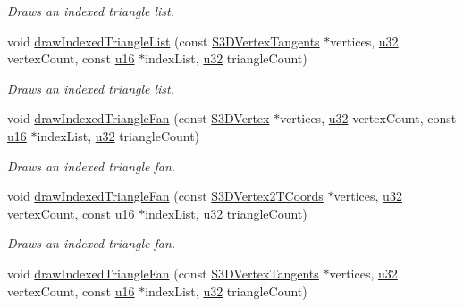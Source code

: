 \begin{DoxyCompactItemize}
\begin{DoxyCompactList}\small\item\em Draws an indexed triangle list. \end{DoxyCompactList}\item 
void \hyperlink{classirr_1_1video_1_1IVideoDriver_a09777bd8ca7a25e6f6134369e5dfb680}{draw\+Indexed\+Triangle\+List} (const \hyperlink{structirr_1_1video_1_1S3DVertexTangents}{S3\+D\+Vertex\+Tangents} $\ast$vertices, \hyperlink{namespaceirr_a0416a53257075833e7002efd0a18e804}{u32} vertex\+Count, const \hyperlink{namespaceirr_ae9f8ec82692ad3b83c21f555bfa70bcc}{u16} $\ast$index\+List, \hyperlink{namespaceirr_a0416a53257075833e7002efd0a18e804}{u32} triangle\+Count)
\begin{DoxyCompactList}\small\item\em Draws an indexed triangle list. \end{DoxyCompactList}\item 
void \hyperlink{classirr_1_1video_1_1IVideoDriver_a8303b9a0f3e941d07d8cdc70c8fc1346}{draw\+Indexed\+Triangle\+Fan} (const \hyperlink{structirr_1_1video_1_1S3DVertex}{S3\+D\+Vertex} $\ast$vertices, \hyperlink{namespaceirr_a0416a53257075833e7002efd0a18e804}{u32} vertex\+Count, const \hyperlink{namespaceirr_ae9f8ec82692ad3b83c21f555bfa70bcc}{u16} $\ast$index\+List, \hyperlink{namespaceirr_a0416a53257075833e7002efd0a18e804}{u32} triangle\+Count)
\begin{DoxyCompactList}\small\item\em Draws an indexed triangle fan. \end{DoxyCompactList}\item 
void \hyperlink{classirr_1_1video_1_1IVideoDriver_ae0b8902326a78075ad1b12d0cfc722aa}{draw\+Indexed\+Triangle\+Fan} (const \hyperlink{structirr_1_1video_1_1S3DVertex2TCoords}{S3\+D\+Vertex2\+T\+Coords} $\ast$vertices, \hyperlink{namespaceirr_a0416a53257075833e7002efd0a18e804}{u32} vertex\+Count, const \hyperlink{namespaceirr_ae9f8ec82692ad3b83c21f555bfa70bcc}{u16} $\ast$index\+List, \hyperlink{namespaceirr_a0416a53257075833e7002efd0a18e804}{u32} triangle\+Count)
\begin{DoxyCompactList}\small\item\em Draws an indexed triangle fan. \end{DoxyCompactList}\item 
void \hyperlink{classirr_1_1video_1_1IVideoDriver_a7fbc69e35e987b4d3882e51a62b8030b}{draw\+Indexed\+Triangle\+Fan} (const \hyperlink{structirr_1_1video_1_1S3DVertexTangents}{S3\+D\+Vertex\+Tangents} $\ast$vertices, \hyperlink{namespaceirr_a0416a53257075833e7002efd0a18e804}{u32} vertex\+Count, const \hyperlink{namespaceirr_ae9f8ec82692ad3b83c21f555bfa70bcc}{u16} $\ast$index\+List, \hyperlink{namespaceirr_a0416a53257075833e7002efd0a18e804}{u32} triangle\+Count)

\end{DoxyCompactItemize}
